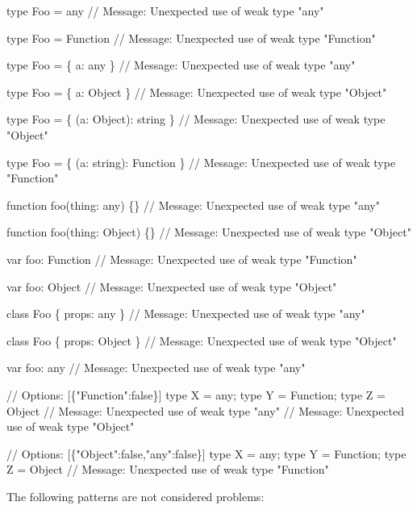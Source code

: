 \begin{DoxyCode}
type Foo = any
// Message: Unexpected use of weak type "any"

type Foo = Function
// Message: Unexpected use of weak type "Function"

type Foo = \{ a: any \}
// Message: Unexpected use of weak type "any"

type Foo = \{ a: Object \}
// Message: Unexpected use of weak type "Object"

type Foo = \{ (a: Object): string \}
// Message: Unexpected use of weak type "Object"

type Foo = \{ (a: string): Function \}
// Message: Unexpected use of weak type "Function"

function foo(thing: any) \{\}
// Message: Unexpected use of weak type "any"

function foo(thing: Object) \{\}
// Message: Unexpected use of weak type "Object"

var foo: Function
// Message: Unexpected use of weak type "Function"

var foo: Object
// Message: Unexpected use of weak type "Object"

class Foo \{ props: any \}
// Message: Unexpected use of weak type "any"

class Foo \{ props: Object \}
// Message: Unexpected use of weak type "Object"

var foo: any
// Message: Unexpected use of weak type "any"

// Options: [\{"Function":false\}]
type X = any; type Y = Function; type Z = Object
// Message: Unexpected use of weak type "any"
// Message: Unexpected use of weak type "Object"

// Options: [\{"Object":false,"any":false\}]
type X = any; type Y = Function; type Z = Object
// Message: Unexpected use of weak type "Function"
\end{DoxyCode}


The following patterns are not considered problems\+:


